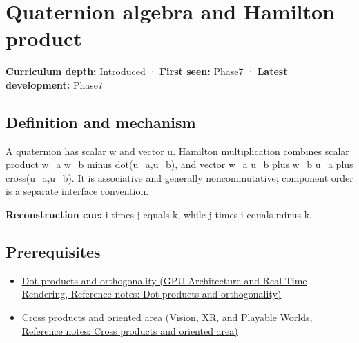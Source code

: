\hypertarget{appendix-965d9260eeab}{}\label{referencestart:appendix-965d9260eeab}
\section{Quaternion algebra and Hamilton product}\label{appendix-965d9260eeab-quaternion-algebra-and-hamilton-product}

\hypertarget{appendix-965d9260eeab-quaternion-algebra-and-hamilton-product}{}

\textbf{Curriculum depth:} Introduced · \textbf{First seen:} Phase7 · \textbf{Latest development:} Phase7

\begin{allmightroledefinition}

\subsection{Definition and mechanism}\label{appendix-965d9260eeab-definition-and-mechanism}

\hypertarget{appendix-965d9260eeab-definition-and-mechanism}{}

A quaternion has scalar w and vector u. Hamilton multiplication combines scalar product w\_a w\_b minus dot(u\_a,u\_b), and vector w\_a u\_b plus w\_b u\_a plus cross(u\_a,u\_b). It is associative and generally noncommutative; component order is a separate interface convention.

\end{allmightroledefinition}

\textbf{Reconstruction cue:} i times j equals k, while j times i equals minus k.

\subsection{Prerequisites}\label{appendix-965d9260eeab-prerequisites}

\hypertarget{appendix-965d9260eeab-prerequisites}{}

\begin{itemize}
\tightlist
\item
  \href{../06-GPU-Architecture-and-Real-Time-Rendering/main.pdf\#nameddest=appendix-8bc4e8fc547c}{Dot products and orthogonality (GPU Architecture and Real-Time Rendering, Reference notes: Dot products and orthogonality)}
\item
  \href{../07-Vision-XR-and-Playable-Worlds/main.pdf\#nameddest=appendix-2391db8052b1}{Cross products and oriented area (Vision, XR, and Playable Worlds, Reference notes: Cross products and oriented area)}
\end{itemize}

